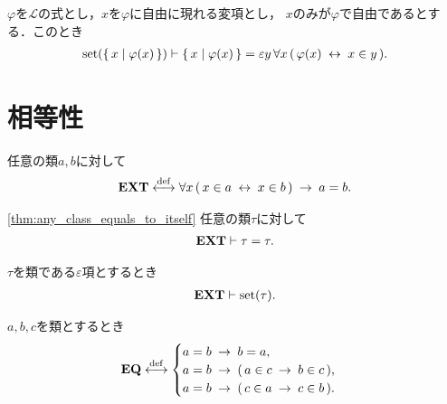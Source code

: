 	\begin{screen}
		\begin{thm}
			$\varphi$を$\mathcal{L}$の式とし，$x$を$\varphi$に自由に現れる変項とし，
			$x$のみが$\varphi$で自由であるとする．このとき
			\begin{align}
				\operatorname*{set} (\left\{\, x \mid \varphi(x)\, \right\}) \vdash \left\{\, x \mid \varphi(x)\, \right\} 
				= \varepsilon y\, \forall x\, (\, \varphi(x) \hspace{0.25em}\leftrightarrow\hspace{0.25em} x \in y\, ).
			\end{align}
		\end{thm}
	\end{screen}
	
\section{相等性}
	\begin{screen}
		\begin{axm}
			任意の類$a,b$に対して
			\begin{align}
				\mbox{{\bf EXT}} \overset{\mathrm{def}}{\longleftrightarrow} \forall x\, (\, x \in a \hspace{0.25em}\leftrightarrow\hspace{0.25em} x \in b\, ) 
				\hspace{0.25em}\rightarrow\hspace{0.25em} a=b.
			\end{align}
		\end{axm}
	\end{screen}
	
	\begin{screen}
		\begin{thm}[任意の類は自分自身と等しい]\ref{thm:any_class_equals_to_itself}
			任意の類$\tau$に対して
			\begin{align}
				\mbox{{\bf EXT}} \vdash \tau = \tau.
			\end{align}
		\end{thm}
	\end{screen}
	
	\begin{screen}
		\begin{thm}
			$\tau$を類である$\varepsilon$項とするとき
			\begin{align}
				\mbox{{\bf EXT}} \vdash \operatorname*{set} (\tau).
			\end{align}
		\end{thm}
	\end{screen}
	
	\begin{screen}
		\begin{axm}[相等性公理]
			$a,b,c$を類とするとき
			\begin{align}
				\mbox{{\bf EQ}} \overset{\mathrm{def}}{\longleftrightarrow}
				\begin{cases}
					a = b \hspace{0.25em}\rightarrow\hspace{0.25em} b = a, & \\
					a = b \hspace{0.25em}\rightarrow\hspace{0.25em} (\, a \in c \hspace{0.25em}\rightarrow\hspace{0.25em} b \in c\, ), & \\
					a = b \hspace{0.25em}\rightarrow\hspace{0.25em} (\, c \in a \hspace{0.25em}\rightarrow\hspace{0.25em} c \in b\, ). & 
				\end{cases}
			\end{align}
		\end{axm}
	\end{screen}
	
